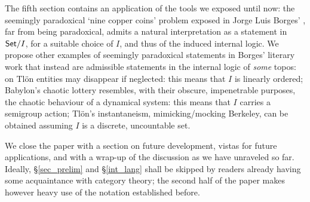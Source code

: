 The fifth section contains an application of the tools we exposed until now: the seemingly paradoxical `nine copper coins' problem exposed in Jorge Luis Borges' \cite{Borges1963}, far from being paradoxical, admits a natural interpretation as a statement in $\mathsf{Set}/I$, for a suitable choice of $I$, and thus of the induced internal logic. We propose other examples of seemingly paradoxical statements in Borges' literary work that instead are admissible statements in the internal logic of \emph{some} topos: on Tl\"on entities may disappear if neglected: this means that $I$ is linearly ordered; Babylon's chaotic lottery resembles, with their obscure, impenetrable purposes, the chaotic behaviour of a dynamical system: this means that $I$ carries a semigroup action; Tl\"on's instantaneism, mimicking/mocking Berkeley, can be obtained assuming $I$ is a discrete, uncountable set.

We close the paper with a section on future development, vistas for future applications, and with a wrap-up of the discussion as we have unraveled so far. Ideally, §\ref{sec_prelim} and §\ref{int_lang} shall be skipped by readers already having some acquaintance with category theory; the second half of the paper makes however heavy use of the notation established before.